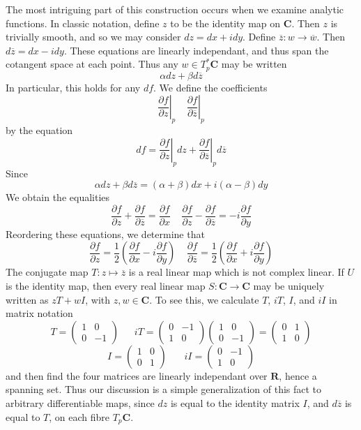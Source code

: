 The most intriguing part of this construction occurs when we examine analytic functions. In classic notation, define $z$ to be the identity map on $\mathbf{C}$. Then $z$ is trivially smooth, and so we may consider $dz = dx + i dy$. Define $\overline{z} : w \to \overline{w}$. Then $d\overline{z} = dx - i dy$. These equations are linearly independant, and thus span the cotangent space at each point. Thus any $w \in T_p^* \mathbf{C}$ may be written
%
\[ \alpha dz + \beta d\overline{z} \]
%
In particular, this holds for any $df$. We define the coefficients
%
\[ \left.\frac{\partial f}{\partial z}\right|_p \ \ \ \ \ \left.\frac{\partial f}{\partial \overline{z}}\right|_p \]
%
by the equation
%
\[ df = \left.\frac{\partial f}{\partial z}\right|_p dz + \left.\frac{\partial f}{\partial \overline{z}}\right|_p d \overline{z} \]
%
Since
%
\[ \alpha dz + \beta d\overline{z} = (\alpha + \beta) dx + i(\alpha - \beta) dy \]
%
We obtain the equalities
%
\[ \frac{\partial f}{\partial z} + \frac{\partial f}{\partial \overline{z}} = \frac{\partial f}{\partial x}\ \ \ \ \ \frac{\partial f}{\partial z} - \frac{\partial f}{\partial \overline{z}} = -i \frac{\partial f}{\partial y} \]
%
Reordering these equations, we determine that
%
\[ \frac{\partial f}{\partial z} = \frac{1}{2} \left( \frac{\partial f}{\partial x} - i \frac{\partial f}{\partial y} \right)\ \ \ \ \ \frac{\partial f}{\partial \overline{z}} = \frac{1}{2} \left( \frac{\partial f}{\partial x} + i \frac{\partial f}{\partial y} \right) \]
%
The conjugate map $T: z \mapsto \overline{z}$ is a real linear map which is not complex linear. If $U$ is the identity map, then every real linear map $S: \mathbf{C} \to \mathbf{C}$ may be uniquely written as $zT + wI$, with $z,w \in \mathbf{C}$. To see this, we calculate $T$, $iT$, $I$, and $iI$ in matrix notation
%
\[ T = \begin{pmatrix} 1 & 0 \\ 0 & -1 \end{pmatrix} \ \ \ \ \ \ \ iT = \begin{pmatrix} 0 & -1 \\ 1 & 0 \end{pmatrix} \begin{pmatrix} 1 & 0 \\ 0 & -1 \end{pmatrix} = \begin{pmatrix} 0 & 1 \\ 1 & 0 \end{pmatrix} \]
%
\[ I = \begin{pmatrix} 1 & 0 \\ 0 & 1 \end{pmatrix}\ \ \ \ \ \ \ \ iI = \begin{pmatrix} 0 & -1 \\ 1 & 0 \end{pmatrix} \]
%
and then find the four matrices are linearly independant over $\mathbf{R}$, hence a spanning set. Thus our discussion is a simple generalization of this fact to arbitrary differentiable maps, since $dz$ is equal to the identity matrix $I$, and $d \overline{z}$ is equal to $T$, on each fibre $T_p \mathbf{C}$.




